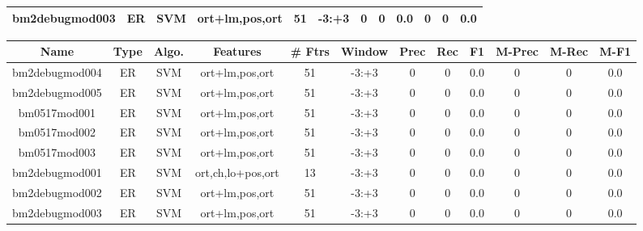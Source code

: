 \documentclass[a4paper]{article}
\begin{document}
\begin{landscape}
\begin{center}
\begin{tabular}{ |c|c|c|c|c|c|c|c|c|c|c|c|}
 
 	
 	\small{ bm2debugmod003 } & ER & SVM & ort+lm,pos,ort  &  51 &  -3:+3  &  0 & 0 & 0.0  &  0 & 0 & 0.0 \\
 	
 \hline
\end{tabular}
\end{center}




\begin{center}
\begin{tabular}{ |c|c|c|c|c|c|c|c|c|c|c|c|} 
 \hline
 	Name & Type & Algo. & Features & \# Ftrs & Window & Prec & Rec & F1 & M-Prec & M-Rec & M-F1\\
 \hline

 	

 
 	
 	\small{ bm2debugmod004 } & ER & SVM & ort+lm,pos,ort  &  51 &  -3:+3  &  0 & 0 & 0.0  &  0 & 0 & 0.0 \\
 	

 
 	
 	\small{ bm2debugmod005 } & ER & SVM & ort+lm,pos,ort  &  51 &  -3:+3  &  0 & 0 & 0.0  &  0 & 0 & 0.0 \\
 	

 
 	
 	\small{ bm0517mod001 } & ER & SVM & ort+lm,pos,ort  &  51 &  -3:+3  &  0 & 0 & 0.0  &  0 & 0 & 0.0 \\
 	

 
 	
 	\small{ bm0517mod002 } & ER & SVM & ort+lm,pos,ort  &  51 &  -3:+3  &  0 & 0 & 0.0  &  0 & 0 & 0.0 \\
 	

 
 	
 	\small{ bm0517mod003 } & ER & SVM & ort+lm,pos,ort  &  51 &  -3:+3  &  0 & 0 & 0.0  &  0 & 0 & 0.0 \\
 	

 
 	
 	\small{ bm2debugmod001 } & ER & SVM & ort,ch,lo+pos,ort  &  13 &  -3:+3  &  0 & 0 & 0.0  &  0 & 0 & 0.0 \\
 	

 
 	
 	\small{ bm2debugmod002 } & ER & SVM & ort+lm,pos,ort  &  51 &  -3:+3  &  0 & 0 & 0.0  &  0 & 0 & 0.0 \\
 	

 
 	
 	\small{ bm2debugmod003 } & ER & SVM & ort+lm,pos,ort  &  51 &  -3:+3  &  0 & 0 & 0.0  &  0 & 0 & 0.0 \\
 	


\end{tabular}
\end{center}
\end{landscape}
\end{document}
